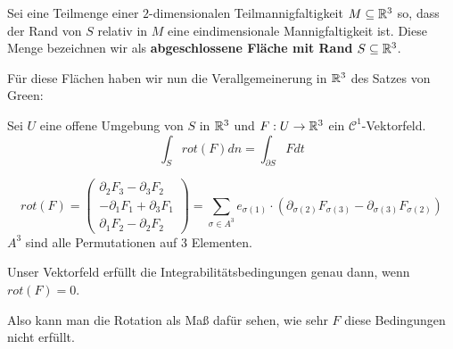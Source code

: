\documentclass[main.tex]{subfiles}
\begin{document}
\begin{Definition}
  Sei eine Teilmenge einer $2$-dimensionalen Teilmannigfaltigkeit $M \subseteq \mathbb{R}^3$ so, dass der Rand von $S$ relativ in $M$ eine eindimensionale Mannigfaltigkeit ist. Diese Menge bezeichnen wir als \textbf{abgeschlossene Fläche mit Rand} $S \subseteq \mathbb{R}^3$.
\end{Definition}

Für diese Flächen haben wir nun die Verallgemeinerung in $\mathbb{R}^3$ des Satzes von Green:

\begin{Theorem}
  Sei $U$ eine offene Umgebung von $S$ in $\mathbb{R}^3$ und $F: U \to \mathbb{R}^3$ ein $\mathcal{C}^1$-Vektorfeld.
  $$\int_S rot(F) dn= \int_{\partial S} F dt$$
\end{Theorem}
\begin{Bemerkung}
  $$rot(F) = \begin{pmatrix}
    \partial_2 F_3 - \partial_3 F_2 \\ -\partial_1 F_1 + \partial_3 F_1 \\ \partial_1 F_2 - \partial_2 F_2
  \end{pmatrix} = \sum \limits_{\sigma \in A^3} e_{\sigma(1)} \cdot (\partial_{\sigma(2)} F_{\sigma(3)} - \partial_{\sigma(3)} F_{\sigma(2)})$$
  $A^3$ sind alle Permutationen auf 3 Elementen.

  Unser Vektorfeld erfüllt die Integrabilitätsbedingungen genau dann, wenn $rot(F) = 0$.

  Also kann man die Rotation als Maß dafür sehen, wie sehr $F$ diese Bedingungen nicht erfüllt.
\end{Bemerkung}
\end{document}
